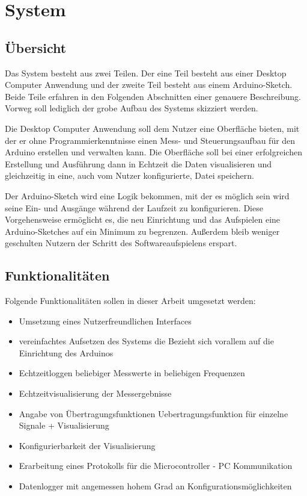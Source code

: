 \chapter{System}
\section{Übersicht}
Das System besteht aus zwei Teilen. Der eine Teil besteht aus einer Desktop Computer Anwendung und der zweite Teil besteht aus einem Arduino-Sketch.
Beide Teile erfahren in den Folgenden Abschnitten einer genauere Beschreibung. Vorweg soll lediglich der grobe Aufbau des Systems skizziert werden.

Die Desktop Computer Anwendung soll dem Nutzer eine Oberfläche bieten, mit der er ohne Programmierkenntnisse einen Mess- und Steuerungsaufbau für den Arduino erstellen und verwalten kann. Die Oberfläche soll bei einer erfolgreichen Erstellung und Ausführung dann in Echtzeit die Daten visualisieren und gleichzeitig in eine, auch vom Nutzer konfigurierte, Datei speichern.

Der Arduino-Sketch wird eine Logik bekommen, mit der es möglich sein wird seine Ein- und Ausgänge während der Laufzeit zu konfigurieren. Diese Vorgehensweise ermöglicht es, die neu Einrichtung und das Aufspielen eine Arduino-Sketches auf ein Minimum zu begrenzen. Außerdem bleib weniger geschulten Nutzern der Schritt des Softwareaufspielens erspart.


\section{Funktionalitäten}
Folgende Funktionalitäten sollen in dieser Arbeit umgesetzt werden:
\begin{itemize}
 \item Umsetzung eines Nutzerfreundlichen Interfaces
 \item vereinfachtes Aufsetzen des Systems
 \subitem die Bezieht sich vorallem auf die Einrichtung des Arduinos
 \item Echtzeitloggen beliebiger Messwerte in beliebigen Frequenzen
 \item Echtzeitvisualisierung der Messergebnisse
 \item Angabe von Übertragungsfunktionen \gls{Uebertragungsfunktion} für einzelne Signale + Visualisierung
 \item Konfigurierbarkeit der Visualisierung
 \item Erarbeitung eines Protokolls für die Microcontroller - PC Kommunikation
 \item Datenlogger mit angemessen hohem Grad an Konfigurationsmöglichkeiten
\end{itemize}

